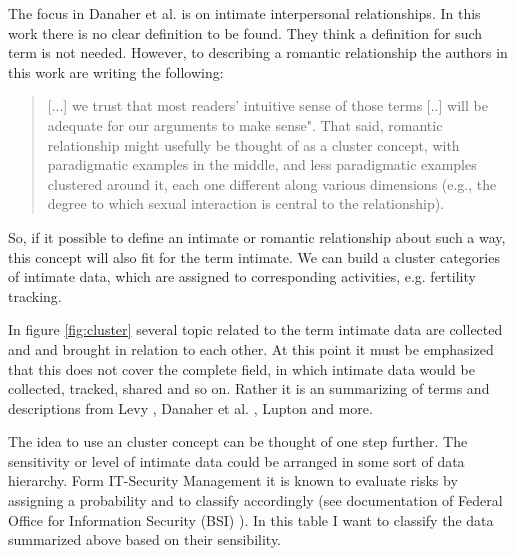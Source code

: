 The focus in Danaher et al. \cite{doi:10.1080/15265161.2017.1409823} is on intimate interpersonal relationships. In this work there is no clear definition to be found. They think a definition for such term is not needed. However, to describing a romantic relationship the authors in this work are writing the following:

\begin{quote}
	[...] we trust that most readers' intuitive sense of those terms [..] will be adequate for our arguments to make sense". 
	That said, romantic relationship might usefully be thought of as a cluster concept, with paradigmatic examples in the middle, and less paradigmatic examples clustered around it, each one different along various dimensions (e.g., the degree to which sexual interaction is central to the relationship).
\end{quote}

So, if it possible to define an intimate or romantic relationship about such a way, this concept will also fit for the term intimate. We can build a cluster categories of intimate data, which are assigned to corresponding activities, e.g. fertility tracking.

In figure \ref{fig:cluster} several topic related to the term intimate data are collected and and brought in relation to each other. At this point it must be emphasized that this does not cover the complete field, in which intimate data would be collected, tracked, shared and so on. Rather it is an summarizing of terms and descriptions from Levy \cite{levy2014intimate}, Danaher et al. \cite{doi:10.1080/15265161.2017.1409823}, Lupton \cite{doi:10.1080/13691058.2014.920528} and more. 

The idea to use an cluster concept can be thought of one step further. The sensitivity or level of intimate data could be arranged in some sort of data hierarchy. Form IT-Security Management it is known to evaluate risks by assigning a probability and to classify accordingly (see documentation of Federal Office for Information Security (BSI) \cite{bsi}). In this table I want to classify the data summarized above based on their sensibility.


